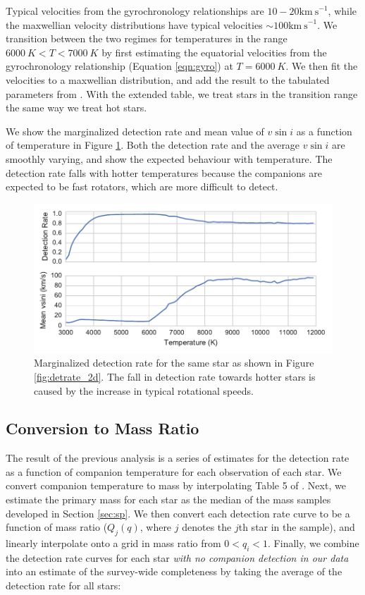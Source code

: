 \documentclass{emulateapj}
\begin{document}
Typical velocities from the gyrochronology relationships are $10-20 \mathrm{km\ s}^{-1}$, while the maxwellian velocity distributions have typical velocities $\sim 100 \mathrm{km\ s}^{-1}$. We transition between the two regimes for temperatures in the range $6000\ K < T < 7000\ K$ by first estimating the equatorial velocities from the gyrochronology relationship (Equation \ref{eqn:gyro}) at $T=6000\ K$. We then fit the velocities to a maxwellian distribution, and add the result to the tabulated parameters from \citep{Zorec2012}. With the extended table, we treat stars in the transition range the same way we treat hot stars.
 
We show the marginalized detection rate and mean value of $v\sin{i}$ as a function of temperature in Figure \ref{fig:marginalized}. Both the detection rate and the average $v\sin{i}$ are smoothly varying, and show the expected behaviour with temperature. The detection rate falls with hotter temperatures because the companions are expected to be fast rotators, which are more difficult to detect. 


\begin{figure}
\includegraphics[width=\columnwidth]{HIP_24244_20130919_marginalized.pdf}
\caption{Marginalized detection rate for the same star as shown in Figure \ref{fig:detrate_2d}. The fall in detection rate towards hotter stars is caused by the increase in typical rotational speeds.}
\label{fig:marginalized}
\end{figure}

\subsection{Conversion to Mass Ratio}

The result of the previous analysis is a series of estimates for the detection rate as a function of companion temperature for each observation of each star. We convert companion temperature to mass by interpolating Table 5 of \citet{Pecaut2013}. Next, we estimate the primary mass for each star as the median of the mass samples developed in Section \ref{sec:sp}. We then convert each detection rate curve to be a function of mass ratio ($Q_j(q)$, where $j$ denotes the $j$th star in the sample), and linearly interpolate onto a grid in mass ratio from $0 < q_i < 1$. Finally, we combine the detection rate curves for each star \emph{with no companion detection in our data} into an estimate of the survey-wide completeness by taking the average of the detection rate for all stars:
\end{document}
